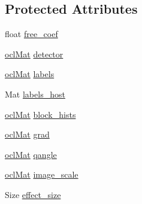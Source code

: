 \subsection*{Protected Attributes}
\begin{DoxyCompactItemize}
\item 
float \hyperlink{structcv_1_1ocl_1_1HOGDescriptor_a22c27636575792ee17cd29f38d9d9fd3}{free\-\_\-coef}
\item 
\hyperlink{classcv_1_1ocl_1_1oclMat}{ocl\-Mat} \hyperlink{structcv_1_1ocl_1_1HOGDescriptor_a52a29986e44a552923de5c5669f2e130}{detector}
\item 
\hyperlink{classcv_1_1ocl_1_1oclMat}{ocl\-Mat} \hyperlink{structcv_1_1ocl_1_1HOGDescriptor_a01a584dcc9a5c4da7f70f21baf85d5f5}{labels}
\item 
Mat \hyperlink{structcv_1_1ocl_1_1HOGDescriptor_abff7fc1290bd19dd5c3913070acea05a}{labels\-\_\-host}
\item 
\hyperlink{classcv_1_1ocl_1_1oclMat}{ocl\-Mat} \hyperlink{structcv_1_1ocl_1_1HOGDescriptor_ad585b916230f651b3c1bf85e172eba43}{block\-\_\-hists}
\item 
\hyperlink{classcv_1_1ocl_1_1oclMat}{ocl\-Mat} \hyperlink{structcv_1_1ocl_1_1HOGDescriptor_a1d40070e508df4b2629f66f8d2a34618}{grad}
\item 
\hyperlink{classcv_1_1ocl_1_1oclMat}{ocl\-Mat} \hyperlink{structcv_1_1ocl_1_1HOGDescriptor_a35ab7536fc22a7751c929d63543e31cc}{qangle}
\item 
\hyperlink{classcv_1_1ocl_1_1oclMat}{ocl\-Mat} \hyperlink{structcv_1_1ocl_1_1HOGDescriptor_a3a3ba94390579a2eee2fd14ec7a89b0e}{image\-\_\-scale}
\item 
Size \hyperlink{structcv_1_1ocl_1_1HOGDescriptor_a7302856d7a07e1bc2547aba53ec89cf6}{effect\-\_\-size}
\end{DoxyCompactItemize}


